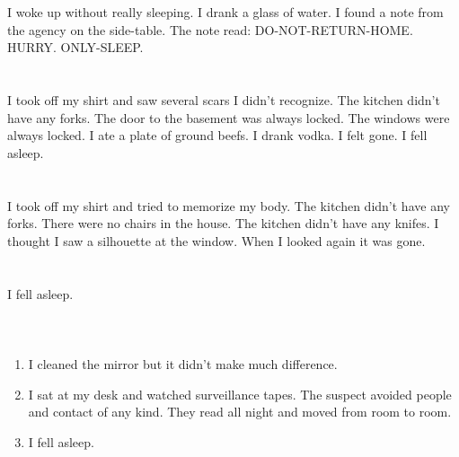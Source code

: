 \documentclass{article}
\begin{document}
    \section{}
    I woke up without really sleeping. I drank a glass of water. I found a note from the agency on the side-table. The note read: DO-NOT-RETURN-HOME. HURRY. ONLY-SLEEP.  
    \newpage
    
    \section{}
    I took off my shirt and saw several scars I didn't recognize. The kitchen didn't have any forks. The door to the basement was always locked. The windows were always locked. I ate a plate of ground beefs. I drank vodka. I felt gone. I fell asleep.  
    \newpage
    
    \section{}
    I took off my shirt and tried to memorize my body. The kitchen didn't have any forks. There were no chairs in the house. The kitchen didn't have any knifes. I thought I saw a silhouette at the window. When I looked again it was gone.  
    \newpage
    
    \section{}
    I fell asleep.\\\\ 
    \newpage
    
    \section{}
    
    \begin{enumerate}
    
    \item I cleaned the mirror but it didn't make much difference.\\
    
    \item I sat at my desk and watched surveillance tapes. The suspect avoided people and contact of any kind. They read all night and moved from room to room.\\
    
    \item I fell asleep.\\
    
    \end{enumerate}
     
\end{document}
